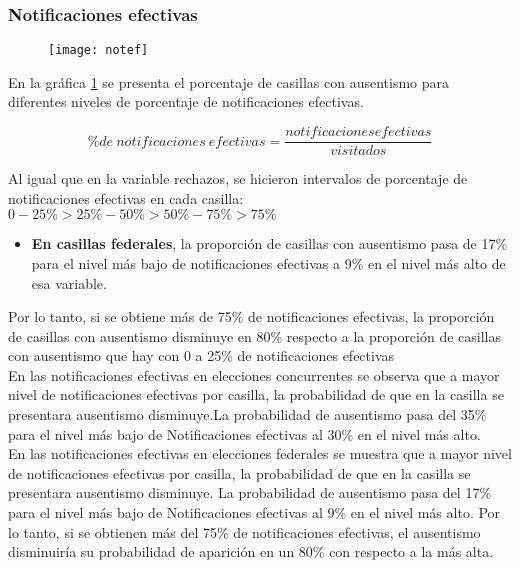 \documentclass[DIV=calc, 
					paper=letter, 
					fontsize=11pt, 
					twocolumn]{scrartcl}
\begin{document}
\subsubsection{Notificaciones efectivas}
\vspace{3mm}

\begin{figure}[H]
\caption{}
\centering
\texttt{[image: notef]}
\label{fig:notef}
\end{figure}

En la gr\'afica \ref{fig:notef} se presenta el porcentaje de casillas con ausentismo para diferentes niveles de porcentaje de notificaciones efectivas. 

\begin{equation*}
\% de \ notificaciones \ efectivas = \frac{notificaciones efectivas}{visitados}
\end{equation*}

Al igual que en la variable rechazos, se hicieron intervalos de porcentaje de notificaciones efectivas en cada casilla:\\ 

$0 - 25\%  >25\% - 50\% 	>50\% - 75\%	>75\%$\\

\begin{itemize}
\item \textbf{En casillas federales}, la proporción de casillas con ausentismo pasa de 17\% para el nivel más bajo de notificaciones efectivas a 9\% en el nivel más alto de esa variable.\\
\end{itemize}

Por lo tanto, si se obtiene más de 75\% de notificaciones efectivas, la proporción de casillas con ausentismo disminuye en 80\% respecto a la proporción de casillas con ausentismo que hay con 0 a 25\% de notificaciones efectivas\\

En las notificaciones efectivas en elecciones concurrentes se observa que a mayor nivel de notificaciones efectivas por casilla, la probabilidad de que en la casilla se presentara ausentismo disminuye.La probabilidad de ausentismo pasa del 35\% para el nivel más bajo de Notificaciones efectivas al 30\% en el nivel más alto.\\

En las notificaciones efectivas en elecciones federales se muestra que a mayor nivel de notificaciones efectivas por casilla, la probabilidad de que en la casilla se presentara ausentismo disminuye. La probabilidad de ausentismo pasa del 17\% para el nivel más bajo de Notificaciones efectivas al 9\% en el nivel más alto. Por lo tanto, si se obtienen más del 75\% de notificaciones efectivas, el ausentismo disminuiría su probabilidad de aparición en un 80\% con respecto a la más alta.\\
\end{document}
